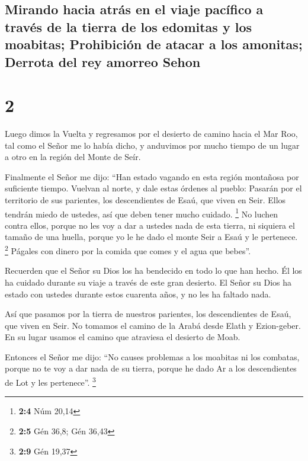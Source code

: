 \hypertarget{mirando-hacia-atruxe1s-en-el-viaje-pacuxedfico-a-travuxe9s-de-la-tierra-de-los-edomitas-y-los-moabitas-prohibiciuxf3n-de-atacar-a-los-amonitas-derrota-del-rey-amorreo-sehon}{%
\subsection{Mirando hacia atrás en el viaje pacífico a través de la
tierra de los edomitas y los moabitas; Prohibición de atacar a los
amonitas; Derrota del rey amorreo
Sehon}\label{mirando-hacia-atruxe1s-en-el-viaje-pacuxedfico-a-travuxe9s-de-la-tierra-de-los-edomitas-y-los-moabitas-prohibiciuxf3n-de-atacar-a-los-amonitas-derrota-del-rey-amorreo-sehon}}

\hypertarget{section-1}{%
\section{2}\label{section-1}}

 Luego dimos la Vuelta y regresamos por el desierto de
camino hacia el Mar Roo, tal como el Señor me lo había dicho, y
anduvimos por mucho tiempo de un lugar a otro en la región del Monte de
Seír.

 Finalmente el Señor me dijo:  ``Han estado
vagando en esta región montañosa por suficiente tiempo. Vuelvan al
norte,  y dale estas órdenes al pueblo: Pasarán por el
territorio de sus parientes, los descendientes de Esaú, que viven en
Seir. Ellos tendrán miedo de ustedes, así que deben tener mucho cuidado.
\footnote{\textbf{2:4} Núm 20,14}  No luchen contra ellos,
porque no les voy a dar a ustedes nada de esta tierra, ni siquiera el
tamaño de una huella, porque yo le he dado el monte Seir a Esaú y le
pertenece. \footnote{\textbf{2:5} Gén 36,8; Gén 36,43} 
Págales con dinero por la comida que comes y el agua que bebes''.

 Recuerden que el Señor su Dios los ha bendecido en todo
lo que han hecho. Él los ha cuidado durante su viaje a través de este
gran desierto. El Señor su Dios ha estado con ustedes durante estos
cuarenta años, y no les ha faltado nada.

 Así que pasamos por la tierra de nuestros parientes, los
descendientes de Esaú, que viven en Seir. No tomamos el camino de la
Arabá desde Elath y Ezion-geber. En su lugar usamos el camino que
atraviesa el desierto de Moab.

 Entonces el Señor me dijo: ``No causes problemas a los
moabitas ni los combatas, porque no te voy a dar nada de su tierra,
porque he dado Ar a los descendientes de Lot y les pertenece''.
\footnote{\textbf{2:9} Gén 19,37}

